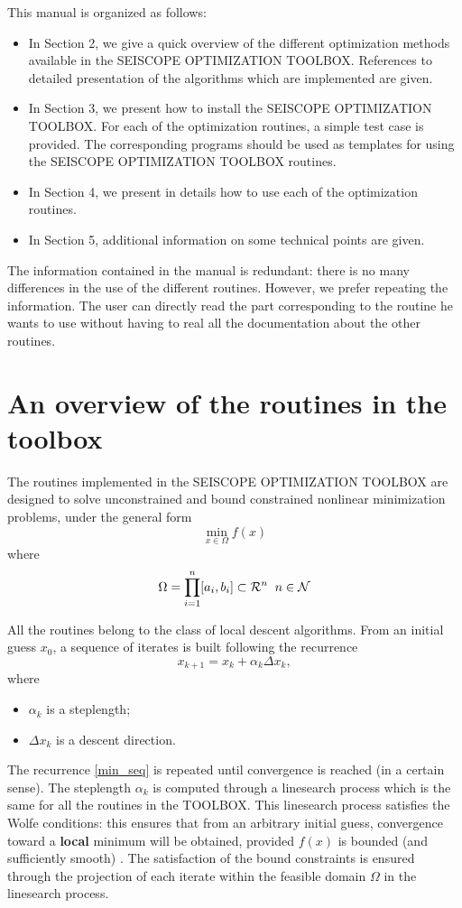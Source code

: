 \documentclass[a4paper,twoside,final,onecolumn,11pt,openright]{article}
\def \mathbb #1{{\cal #1}}
\begin{document}
This manual is organized as follows:
\begin{itemize}
 \item In Section 2, we give a quick overview of the different optimization methods available in the SEISCOPE OPTIMIZATION TOOLBOX. References to detailed presentation of the algorithms which are implemented are given.
 \item In Section 3, we present how to install the SEISCOPE OPTIMIZATION TOOLBOX. For each of the optimization routines, a simple test case is provided. The corresponding programs should be used as templates for using the SEISCOPE OPTIMIZATION TOOLBOX routines. 
 \item In Section 4, we present in details how to use each of the optimization routines.
 \item In Section 5, additional information on some technical points are given. 
\end{itemize}
The information contained in the manual is redundant: there is no many differences in the use of the different routines. However, we prefer repeating the information. The user can directly read the part corresponding to the routine he wants to use without having to real all the documentation about the other routines. 

\newpage 
\section{An overview of the routines in the toolbox}
The routines implemented in the SEISCOPE OPTIMIZATION TOOLBOX are designed to solve unconstrained and bound constrained nonlinear minimization problems, under the general form
\begin{equation}
\label{min_pb}
 \min_{x\in\Omega} f(x)
\end{equation}
where 
\begin{equation}
 \Omega=\prod_{i=1}^n [a_i, b_i] \subset \mathbb{R}^n\;\; n \in \mathbb{N}
\end{equation}

All the routines belong to the class of local descent algorithms. From an initial guess $x_{0}$, a sequence of iterates is built following the recurrence
\begin{equation}
\label{min_seq}
 x_{k+1}=x_k+\alpha_k \Delta x_k,
\end{equation}
where 
\begin{itemize}
 \item $\alpha_k$ is a steplength; 
 \item $\Delta x_k$ is a descent direction.
\end{itemize}
The recurrence \eqref{min_seq} is repeated until convergence is reached (in a certain sense). The steplength $\alpha_k$ is computed through a linesearch process which is the same for all the routines in the TOOLBOX. This linesearch process satisfies the Wolfe conditions: this ensures that from an arbitrary initial guess, convergence toward a \textbf{local} minimum will be obtained, provided $f(x)$ is bounded (and sufficiently smooth) \citep{Nocedal_2006_NO}. The satisfaction of the bound constraints is ensured through the projection of each iterate within the feasible domain $\Omega$ in the linesearch process. 
\end{document}
